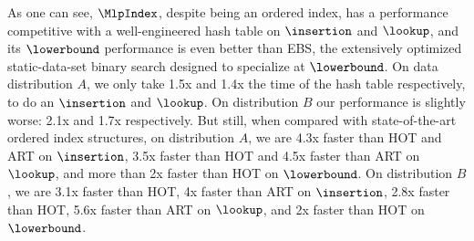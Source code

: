 \documentclass[11pt, usletter]{article}
\begin{document}
As one can see, $\MlpIndex$, despite being an ordered index, 
has a performance competitive with a well-engineered hash table on $\insertion$ and $\lookup$, 
and its $\lowerbound$ performance is even better than EBS, 
the extensively optimized static-data-set binary search designed to specialize at $\lowerbound$.
On data distribution $A$, we only take 1.5x and 1.4x the time of the hash table respectively, to do an $\insertion$ and $\lookup$. 
On distribution $B$ our performance is slightly worse: 2.1x and 1.7x respectively. 
But still, when compared with state-of-the-art ordered index structures, 
on distribution $A$, we are 4.3x faster than HOT and ART on $\insertion$, 
3.5x faster than HOT and 4.5x faster than ART on $\lookup$, 
and more than 2x faster than HOT on $\lowerbound$. 
On distribution $B$, we are 3.1x faster than HOT, 4x faster than ART on $\insertion$, 
2.8x faster than HOT, 5.6x faster than ART on $\lookup$, 
and 2x faster than HOT on $\lowerbound$.
\end{document}
